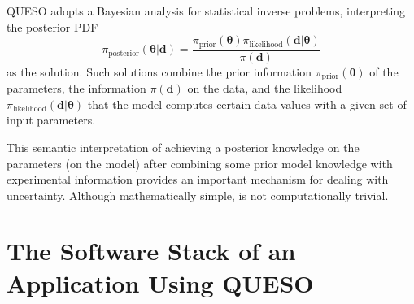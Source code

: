 QUESO adopts a Bayesian analysis \cite{KaSo05, Ro04} for statistical inverse problems, interpreting the posterior PDF
\begin{equation}\label{eq-Bayes-solution}
\pi_{\text{posterior}}(\boldsymbol{\theta}|\mathbf{d})=\frac{\pi_{\text{prior}}(\boldsymbol{\theta})\pi_{\text{likelihood}}(\mathbf{d}|\boldsymbol{\theta})}{\pi(\mathbf{d})}
\end{equation}
as the solution. Such solutions combine the prior information $\pi_{\text{prior}}(\boldsymbol{\theta})$ of the parameters,
the information $\pi(\mathbf{d})$ on the data, and the likelihood $\pi_{\text{likelihood}}(\mathbf{d}|\boldsymbol{\theta})$ that the model computes certain data values with a given set of input parameters.

This semantic interpretation of achieving a posterior knowledge on the parameters (on the model)
after combining some prior model knowledge with experimental information provides an important mechanism for dealing with uncertainty.
Although mathematically simple, is not computationally trivial. 


\section{The Software Stack of an Application Using QUESO}



